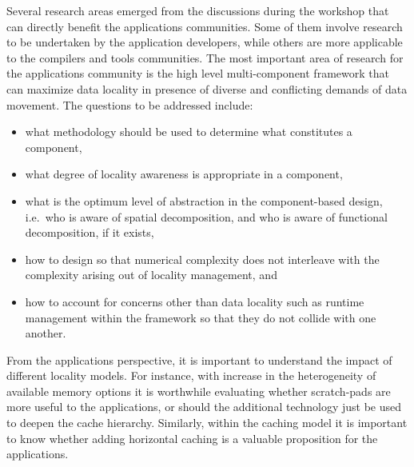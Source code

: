 Several research areas emerged from the discussions during the
workshop that can directly benefit the applications communities. Some
of them involve research to be undertaken by the application
developers, while others are more applicable to the compilers and
tools communities. The most important area of research for the
applications community is the high level multi-component framework
that can maximize data locality in presence of diverse and conflicting
demands of data movement. The questions to be addressed include:
\begin{itemize}
\item what methodology should be used to determine what constitutes a
component,
\item what degree of locality awareness is appropriate in a
component,
\item what is the optimum level of abstraction in the component-based
design, i.e.\ who is aware of spatial decomposition, and who is
aware of functional decomposition, if it exists,
\item how to design so that
numerical complexity does not interleave with the complexity arising
out of locality management, and
\item how to account for concerns other
than data locality such as runtime management within the framework so
that they do not collide with one another. 
\end{itemize}

From the applications perspective, it is important to understand the
impact of different locality models. For instance, with increase in
the heterogeneity of available memory options it is worthwhile
evaluating whether scratch-pads are more useful to the applications,
or should the additional technology just be used to deepen the cache
hierarchy. Similarly, within the caching model it is important to know
whether adding horizontal caching is a valuable proposition for the
applications.
